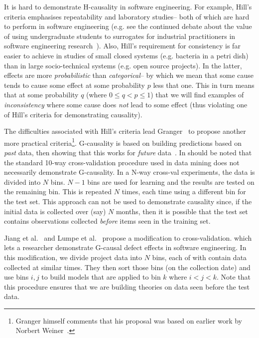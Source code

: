 \documentclass[conference]{IEEEtran}
\begin{document}
It is hard to demonstrate H-causality in software engineering.
For example, Hill's criteria emphasises repeatability and laboratory studies-- both of which are
hard to perform in software engineering (e.g. see the continued debate about
the value of using undergraduate students to surrogates for industrial
practitioners in software engineering research~\cite{Carver2003}). Also, Hill's requirement
for consistency is far easier to achieve in studies of small closed systems (e.g. bacteria in a petri dish)
than in large socio-technical systems (e.g. open source projects). In the latter,
effects are more {\em probabilistic} than {\em categorical}-- by which we mean that 
some cause tends to cause some effect at some probability $p$ less that one.
This in turn means that at some probability $q$ (where $0 \le q < p \le 1$)
that we will find examples of {\em inconsistency} where some cause does {\em not} lead
to some effect (thus violating one of Hill's criteria for demonstrating causality).

The  difficulties associated with Hill's criteria lead Granger~\cite{granger80}
to propose another more practical criteria\footnote{Granger  himself comments that
his proposal was based on earlier work by Norbert Weiner~\cite{Seth2007}.}.
\mbox{G-causality} is based on building predictions based on {\em past} data,
then showing that this works for {\em future} data~\cite{granger80}. 
In should be noted  that the standard 10-way cross-validation
procedure used  in data mining does not necessarily demonstrate G-causality.  In a N-way cross-val experiments, the data is divided into $N$ bins.  
$N-1$ bins are used for learning and the results are tested
on the  remaining bin.
This is repeated $N$ times, each time using a different bin for the test set.
This approach can not be used to demonstrate causality since, if the initial data is collected
over (say) $N$ months, then it is possible that the test set contains observations collected
{\em before}   items seen in the training set. 

Jiang et al.~\cite{me11f} and Lumpe et al.~\cite{me11f} propose a modification to cross-validation.
which lets a researcher
demonstrate G-causal defect effects in software engineering.
In this modification, we  divide project data  into $N$ bins, each of with contain data collected at similar times.
They then sort those bins (on the collection date) and use bins $i,j$ to build models that
are applied to bin  $k$ where 
$i<j<k$. Note that this procedure ensures that we are building theories on data seen
before the test data.
\end{document}
